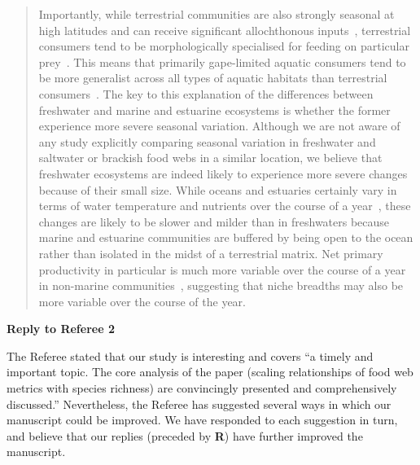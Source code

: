 \documentclass[12pt]{letter}
\begin{document}
\begin{quotation}
    Importantly, while terrestrial communities are also 
    strongly seasonal at high latitudes and can receive 
    significant allochthonous inputs~\cite{Nakano2001}, 
    terrestrial consumers tend to be morphologically 
    specialised for feeding on particular 
    prey~\cite{Liem1990}. This means that primarily 
    gape-limited aquatic consumers tend to be more
    generalist across all types of aquatic habitats than 
    terrestrial consumers~\cite{Liem1990,Shurin2006}. The
    key to this explanation of the differences between 
    freshwater and marine and estuarine  ecosystems is 
    whether the former experience more severe seasonal 
    variation. Although we are not aware of any study 
    explicitly comparing seasonal variation in freshwater 
    and saltwater or brackish food webs in a similar 
    location, we believe that freshwater ecosystems are 
    indeed likely to  experience more severe changes 
    because of their small size. While oceans and estuaries 
    certainly vary in terms of water temperature and
    nutrients over the course of a year~\cite{Baird1989}, 
    these changes are likely to be slower and milder than 
    in freshwaters because marine and estuarine communities 
    are buffered by being open to the ocean rather than 
    isolated in the midst of a terrestrial matrix. Net 
    primary productivity in particular is much more 
    variable over the course of a year in non-marine 
    communities~\cite{Field1998}, suggesting that niche 
    breadths may also be more variable over the course of 
    the year.

  \end{quotation}


  \newpage

{\Large \bf Reply to Referee 2}

  The Referee stated that our study is interesting and covers ``a timely and
  important topic. The core analysis of the paper (scaling relationships of
  food web metrics with species richness) are convincingly presented and
  comprehensively discussed.'' Nevertheless, the Referee has suggested several
  ways in which our manuscript could be improved. We have responded to each suggestion
  in turn, and believe that our replies (preceded by \textbf{R}) have further improved
  the manuscript.


\end{document}
